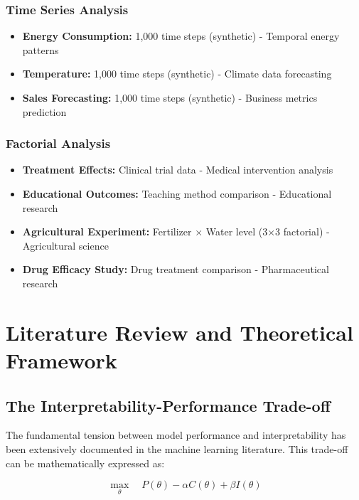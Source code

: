 \documentclass[11pt,a4paper]{article}
\begin{document}
\subsubsection{Time Series Analysis}
\begin{itemize}
    \item \textbf{Energy Consumption:} 1,000 time steps (synthetic) - Temporal energy patterns
    \item \textbf{Temperature:} 1,000 time steps (synthetic) - Climate data forecasting
    \item \textbf{Sales Forecasting:} 1,000 time steps (synthetic) - Business metrics prediction
\end{itemize}

\subsubsection{Factorial Analysis}
\begin{itemize}
    \item \textbf{Treatment Effects:} Clinical trial data - Medical intervention analysis
    \item \textbf{Educational Outcomes:} Teaching method comparison - Educational research
    \item \textbf{Agricultural Experiment:} Fertilizer × Water level (3×3 factorial) - Agricultural science
    \item \textbf{Drug Efficacy Study:} Drug treatment comparison - Pharmaceutical research
\end{itemize}

\section{Literature Review and Theoretical Framework}

\subsection{The Interpretability-Performance Trade-off}

The fundamental tension between model performance and interpretability has been extensively documented in the machine learning literature. This trade-off can be mathematically expressed as:

\begin{equation}
\max_\theta \quad P(\theta) - \alpha C(\theta) + \beta I(\theta)
\label{eq:optimization}
\end{equation}
\end{document}
